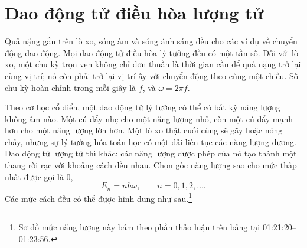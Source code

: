 \begin{classroomqa}
\end{classroomqa}

\begin{classroomqa}
\end{classroomqa}

\begin{classroomqa}
\end{classroomqa}

\section{Dao động tử điều hòa lượng tử}

Quả nặng gắn trên lò xo, sóng âm và sóng ánh sáng đều cho các ví dụ về chuyển động dao động. Mọi dao động tử điều hòa lý tưởng đều có một tần số. Đối với lò xo, một chu kỳ trọn vẹn không chỉ đơn thuần là thời gian cần để quả nặng trở lại cùng vị trí; nó còn phải trở lại vị trí ấy với chuyển động theo cùng một chiều. Số chu kỳ hoàn chỉnh trong mỗi giây là \(f\), và \(\omega=2\pi f\).

Theo cơ học cổ điển, một dao động tử lý tưởng có thể có bất kỳ năng lượng không âm nào. Một cú đẩy nhẹ cho một năng lượng nhỏ, còn một cú đẩy mạnh hơn cho một năng lượng lớn hơn. Một lò xo thật cuối cùng sẽ gãy hoặc nóng chảy, nhưng sự lý tưởng hóa toán học có một dải liên tục các năng lượng dương. Dao động tử lượng tử thì khác: các năng lượng được phép của nó tạo thành một thang rời rạc với khoảng cách đều nhau. Chọn gốc năng lượng sao cho mức thấp nhất được gọi là 0,
\begin{equation}
E_n=n\hbar\omega,
\qquad n=0,1,2,\ldots .
\end{equation}
Các mức cách đều có thể được hình dung như sau.\footnote{Sơ đồ mức năng lượng này bám theo phần thảo luận trên bảng tại 01:21:20--01:23:56.}


